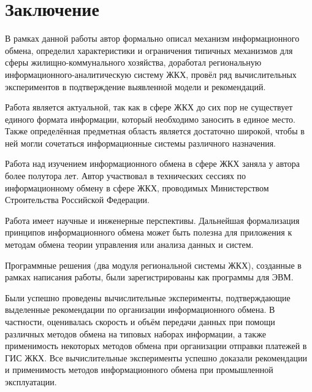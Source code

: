 \section*{Заключение}

В рамках данной работы автор формально описал механизм информационного обмена, определил характеристики и ограничения типичных механизмов для сферы жилищно-коммунального хозяйства, доработал региональную информационного-аналитическую систему ЖКХ, провёл ряд вычислительных экспериментов в подтверждение выявленной модели и рекомендаций.

Работа является актуальной, так как в сфере ЖКХ до сих пор не существует единого формата информации, который необходимо заносить в единое место.
Также определённая предметная область является достаточно широкой, чтобы в ней могли сочетаться информационные системы различного назначения.

Работа над изучением информационного обмена в сфере ЖКХ заняла у автора более полутора лет.
Автор участвовал в технических сессиях по информационному обмену в сфере ЖКХ, проводимых Министерством Строительства Российской Федерации.

Работа имеет научные и инженерные перспективы.
Дальнейшая формализация принципов информационного обмена может быть полезна для приложения к методам обмена теории управления или анализа данных и систем.

Программные решения (два модуля региональной системы ЖКХ), созданные в рамках написания работы, были зарегистрированы как программы для ЭВМ.

Были успешно проведены вычислительные эксперименты, подтверждающие выделенные рекомендации по организации информационного обмена.
В частности, оценивалась скорость и объём передачи данных при помощи различных методов обмена на типовых наборах информации, а также применимость некоторых методов обмена при организации отправки платежей в ГИС ЖКХ.
Все вычислительные эксперименты успешно доказали рекомендации и применимость методов информационного обмена при промышленной эксплуатации.

\clearpage
\newpage